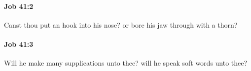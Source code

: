 		\paragraph{Job 41:2} %
			\label{JOB-41-2}

			Canst thou put an hook into his nose? or bore his jaw through with a thorn?


		\paragraph{Job 41:3} %
			\label{JOB-41-3}

			Will he make many supplications unto thee? will he speak soft words unto thee?


